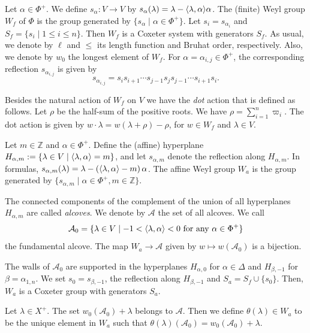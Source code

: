 Let $\alpha\in \Phi^+$. We define $s_{\alpha}: V\rightarrow V$ by $s_\alpha(\lambda) = \lambda - \langle \lambda , \alpha \rangle\alpha $. 
The (finite) Weyl group $W_f$ of $\Phi$ is the group generated by $\{s_{\alpha}\mid \alpha \in \Phi^+ \}$. 
Let $s_i = s_{\alpha_i}$ and $S_{f}=\{s_i \mid 1\leq i \leq n\}$. 
Then $W_f$ is a Coxeter system with generators $S_f$. 
As usual, we denote by $\ell $ and $\leq$ its length function and Bruhat order, respectively. 
Also, we denote by $w_0$ the longest element of  $W_f$. 
For $\alpha=\alpha_{i,j}\in \Phi^{+}$, the corresponding reflection $s_{\alpha_{i,j}}$ is given by
\begin{equation}\label{eq:reflection}
s_{\alpha_{i,j}} = s_i s_{i+1}\cdots s_{j-1}s_j s_{j-1}\cdots s_{i+1}s_i.
\end{equation}




Besides the natural action of $W_f$ on $V$ we have the \emph{dot} action that is defined as follows. 
Let $\rho $ be the half-sum of the positive roots. 
We have $\rho = \sum_{i=1}^n \varpi_i$. 
The dot action is given by $w\cdot \lambda = w(\lambda +\rho) -\rho$, for $w\in W_f$ and $\lambda \in V$. 

Let $m\in\mathbb{Z}$ and $\alpha\in\Phi^+$. 
Define the (affine) hyperplane
$H_{\alpha,m}:=\{\lambda\in V \mid \langle \lambda , \alpha \rangle=m\}$,
and let $s_{\alpha,m}$ denote the reflection along $H_{\alpha,m}$.
In formulas, $s_{\alpha,m}(\lambda)=\lambda-(\langle \lambda , \alpha \rangle-m)\,\alpha$.
The affine Weyl group $W_a$ is the group generated by $\{s_{\alpha,m } \mid \alpha\in \Phi^+, m\in \mathbb{Z}\}$. 

The connected components of the complement of the union of all hyperplanes
$H_{\alpha , m}$ are called \emph{alcoves}. 
We denote by $\mathcal{A}$ the set of all alcoves. 
We call 
$$\mathcal{A}_0 = \{ \lambda \in V \mid -1 < \langle \lambda , \alpha \rangle < 0  \mbox{ for any } \alpha \in \Phi^+  \}$$ the fundamental alcove. 
The map $W_a \rightarrow \mathcal{A}$ given by $w\mapsto w(\mathcal{A}_0)$ is a bijection. 

The walls of $\mathcal{A}_0$ are supported in the hyperplanes $H_{\alpha , 0}$ for $\alpha \in \Delta$ and $H_{\beta , -1}$ for $\beta = \alpha_{1,n}$. 
We set $s_{0} = s_{\beta , -1}$, the reflection along $H_{\beta , -1}$ and $S_a = S_f \cup \{s_0\}$. 
Then, $W_a$ is a Coxeter group with generators $S_a$. 

\begin{definition}\rm \label{def: theta lambda}
    Let $\lambda \in X^+$. 
    The set $w_0(\mathcal{A}_0)+\lambda$ belongs to $\mathcal{A}$. 
    Then we define $\theta(\lambda) \in W_a$ to be the unique element in $W_a$ such that $\theta(\lambda) (\mathcal{A}_0) =  w_0(\mathcal{A}_0)+\lambda$. 
\end{definition}





